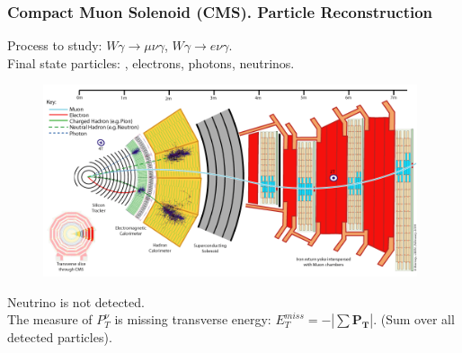 \begin{frame}\frametitle{Compact Muon Solenoid (CMS). Particle Reconstruction}
\tiny
Process to study: $W\gamma\rightarrow\mu\nu\gamma$, $W\gamma\rightarrow e\nu\gamma$.\\
Final state particles: {\color{celestialblue}{muons}}, {\color{red}electrons}, {\color{egyptianblue}photons}, neutrinos.\\
\begin{figure}[htb]
  \begin{center}
    {\includegraphics[width=0.98\textwidth]{../figs/ForPresentation/CMS_Slice.png}}
  \end{center}
\end{figure}

\tiny
Neutrino is not detected. \\
The measure of $P_T^{\nu}$ is missing transverse energy: $  E_T^{miss} = - | \sum \mathbf{P_T} |$. (Sum over all detected particles).\\

\end{frame}%


